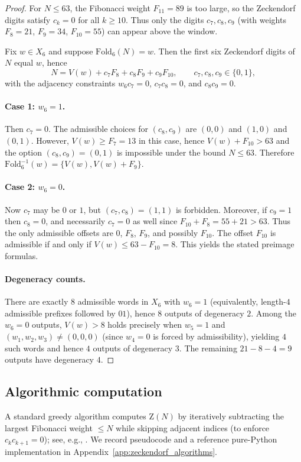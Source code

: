 \begin{proof}
For $N\le 63$, the Fibonacci weight $F_{11}=89$ is too large, so the Zeckendorf digits satisfy $c_k=0$ for all $k\ge 10$.
Thus only the digits $c_7,c_8,c_9$ (with weights $F_8=21$, $F_9=34$, $F_{10}=55$) can appear above the window.

Fix $w\in X_6$ and suppose $\mathrm{Fold}_6(N)=w$.
Then the first six Zeckendorf digits of $N$ equal $w$, hence
\[
N=V(w)+c_7 F_8 + c_8 F_9 + c_9 F_{10},
\qquad c_7,c_8,c_9\in\{0,1\},
\]
with the adjacency constraints $w_6 c_7=0$, $c_7 c_8=0$, and $c_8 c_9=0$.

\paragraph{Case 1: \texorpdfstring{$w_6=1$}{w6=1}.}
Then $c_7=0$. The admissible choices for $(c_8,c_9)$ are $(0,0)$ and $(1,0)$ and $(0,1)$.
However, $V(w)\ge F_7=13$ in this case, hence $V(w)+F_{10}>63$ and the option $(c_8,c_9)=(0,1)$ is impossible under the bound $N\le 63$.
Therefore $\mathrm{Fold}_6^{-1}(w)=\{V(w),V(w)+F_9\}$.

\paragraph{Case 2: \texorpdfstring{$w_6=0$}{w6=0}.}
Now $c_7$ may be $0$ or $1$, but $(c_7,c_8)=(1,1)$ is forbidden.
Moreover, if $c_9=1$ then $c_8=0$, and necessarily $c_7=0$ as well since $F_{10}+F_8=55+21>63$.
Thus the only admissible offsets are $0$, $F_8$, $F_9$, and possibly $F_{10}$.
The offset $F_{10}$ is admissible if and only if $V(w)\le 63-F_{10}=8$.
This yields the stated preimage formulas.

\paragraph{Degeneracy counts.}
There are exactly $8$ admissible words in $X_6$ with $w_6=1$ (equivalently, length-$4$ admissible prefixes followed by $01$), hence $8$ outputs of degeneracy $2$.
Among the $w_6=0$ outputs, $V(w)>8$ holds precisely when $w_5=1$ and $(w_1,w_2,w_3)\neq (0,0,0)$ (since $w_4=0$ is forced by admissibility), yielding $4$ such words and hence $4$ outputs of degeneracy $3$.
The remaining $21-8-4=9$ outputs have degeneracy $4$.
\end{proof}

\subsection{Algorithmic computation}
A standard greedy algorithm computes $\mathrm{Z}(N)$ by iteratively subtracting the largest Fibonacci weight $\le N$ while skipping adjacent indices (to enforce $c_k c_{k+1}=0$); see, e.g., \cite{AlloucheShallit2003}.
We record pseudocode and a reference pure-Python implementation in Appendix~\ref{app:zeckendorf_algorithms}.

